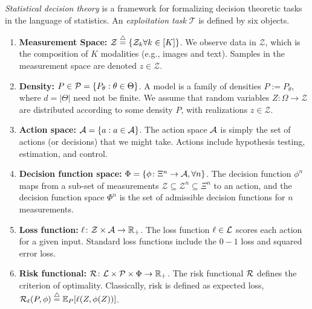 \documentclass{article}
\begin{document}
\emph{Statistical decision theory} is a framework for formalizing decision theoretic tasks in the language of statistics.  An \emph{exploitation task} $\mathcal{T}$ is defined by six objects.
\begin{enumerate}
  \item \textbf{Measurement Space:} $\mathcal{Z} \overset{\triangle}{=} \{ \mathcal{Z}_k \forall k \in [K]\}$. We observe data in $\mathcal{Z}$, which is the composition of  $K$ modalities (e.g., images and text).  Samples in the measurement space are denoted  $z \in \mathcal{Z}$.  
	\item \textbf{Density:} $P \in \mathcal{P}=\{P_{\theta}: \theta \in \Theta\}$.  A model is a family of densities $P := P_{\theta}$, where $d=|\Theta|$ need not be finite. 
    We assume that random variables $Z \colon \Omega \to \mathcal{Z}$  are distributed according to some density $P$, with realizations $z \in \mathcal{Z}$.
	\item \textbf{Action space:} $\mathcal{A}=\{a : a \in \mathcal{A}\}$.  The action space $\mathcal{A}$ is simply the set of actions (or decisions) that we might take.  Actions  include hypothesis testing, estimation, and control. 
	\item \textbf{Decision function space:} $\Phi = \{\phi \colon \Xi^n \to \mathcal{A}, \forall n \}$. The decision function $\phi^n$ maps from a sub-set of measurements $\mathcal{Z} \subseteq \mathcal{Z}^n \subseteq \Xi^n$ to an action, and the decision function space $\Phi^n$ is the set of admissible decision functions for $n$ measurements.
	\item \textbf{Loss function:} $\ell \colon \mathcal{Z} \times \mathcal{A} \to \mathbb{R}_+$.  The loss function $\ell \in \mathcal{L}$ scores each action for a given input.  Standard loss functions include the $0-1$ loss and squared error loss. 
	\item \textbf{Risk functional:} $\mathcal{R} \colon \mathcal{L} \times \mathcal{P} \times \Phi \to \mathbb{R}_+$.	The risk functional $\mathcal{R}$ defines the criterion of optimality.  Classically, risk is defined as expected loss, $\mathcal{R}_\ell(P,\phi) \overset{\triangle}{=} \mathbb{E}_P[\ell(Z,\phi(Z))]$.
\end{enumerate}
\end{document}
